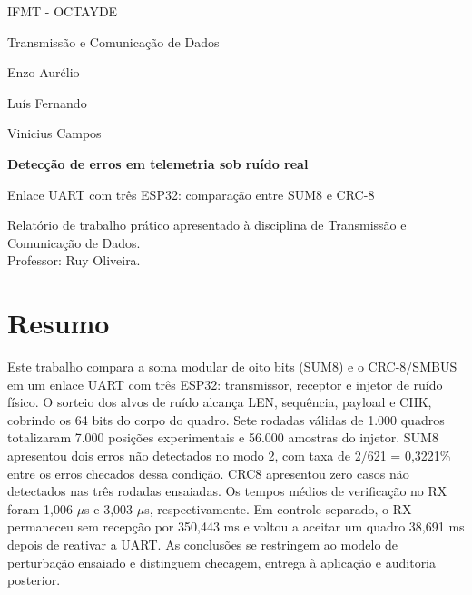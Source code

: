 \documentclass[12pt,a4paper]{article}
\begin{document}
\hypersetup{pageanchor=false}
\begin{titlepage}
\centering
{\large IFMT - OCTAYDE\par}
{\large Transmissão e Comunicação de Dados\par}
\vspace{2.4cm}
{\large Enzo Aurélio\par}
{\large Luís Fernando\par}
{\large Vinicius Campos\par}
\vspace{2.7cm}
{\LARGE\bfseries Detecção de erros em telemetria sob ruído real\par}
\vspace{0.7cm}
{\Large Enlace UART com três ESP32: comparação entre SUM8 e CRC-8\par}
\vspace{1.8cm}
\begin{flushright}
\begin{minipage}{0.62\textwidth}
\singlespacing
Relatório de trabalho prático apresentado à disciplina de Transmissão e Comunicação de Dados.\\[0.5em]
Professor: Ruy Oliveira.
\end{minipage}
\end{flushright}
\vfill
\end{titlepage}
\hypersetup{pageanchor=true}


\section*{Resumo}

Este trabalho compara a soma modular de oito bits (SUM8) e o CRC-8/SMBUS em um enlace UART com três ESP32: transmissor, receptor e injetor de ruído físico. O sorteio dos alvos de ruído alcança LEN, sequência, payload e CHK, cobrindo os 64 bits do corpo do quadro. Sete rodadas válidas de 1.000 quadros totalizaram 7.000 posições experimentais e 56.000 amostras do injetor. SUM8 apresentou dois erros não detectados no modo 2, com taxa de 2/621 = 0,3221\% entre os erros checados dessa condição. CRC8 apresentou zero casos não detectados nas três rodadas ensaiadas. Os tempos médios de verificação no RX foram 1,006 \ensuremath{\mu}s e 3,003 \ensuremath{\mu}s, respectivamente. Em controle separado, o RX permaneceu sem recepção por 350,443 ms e voltou a aceitar um quadro 38,691 ms depois de reativar a UART. As conclusões se restringem ao modelo de perturbação ensaiado e distinguem checagem, entrega à aplicação e auditoria posterior.\par
\end{document}
